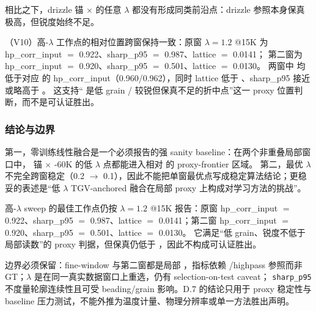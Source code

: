 相比之下，drizzle 锚 \(\times\)  的任意 \(\lambda\) 都没有形成同类前沿点：drizzle 参照本身保真极高，但锐度始终不足。

（V10）高-\(\lambda\) 工作点的相对位置跨窗保持一致：原窗 \(\lambda = 1.2\) @15K 为 hp\_corr\_input \(=\) 0.922、sharp\_p95 \(=\) 0.987、lattice \(=\) 0.0141；
第二窗为 hp\_corr\_input \(=\) 0.920、sharp\_p95 \(=\) 0.501、lattice \(=\) 0.0130。
两窗中  均低于对应  的 hp\_corr\_input（0.960/0.962），同时 lattice 低于 、sharp\_p95 接近或略高于 。
这支持“ 是低 grain / 较锐但保真不足的折中点”这一 proxy 位置判断，而不是可认证胜出。

\subsubsection{结论与边界}

第一，零训练线性融合是一个必须报告的强 sanity baseline：在两个非重叠局部窗口中， 锚 \(\times\) -60K 的低 \(\lambda\) 点都能进入相对  的 proxy-frontier 区域。
第二，最优 \(\lambda\) 不完全跨窗稳定（0.2 \(\rightarrow\) 0.1），因此不能把单窗最优点写成稳定算法结论；更稳妥的表述是“低 \(\lambda\) TGV-anchored 融合在局部 proxy 上构成对学习方法的挑战”。

 高-\(\lambda\) sweep 的最佳工作点仍按 \(\lambda = 1.2\) @15K 报告：原窗 hp\_corr\_input \(=\) 0.922、sharp\_p95 \(=\) 0.987、lattice \(=\) 0.0141；第二窗 hp\_corr\_input \(=\) 0.920、sharp\_p95 \(=\) 0.501、lattice \(=\) 0.0130。
它满足“低 grain、锐度不低于  局部读数”的 proxy 判据，但保真仍低于 ，因此不构成可认证胜出。

边界必须保留：fine-window 与第二窗都是局部 ，指标依赖 /highpass 参照而非 GT；\(\lambda\) 是在同一真实数据窗口上重选，仍有 selection-on-test caveat；
\texttt{sharp\_p95} 不度量轮廓连续性且可受 beading/grain 影响。D.7 的结论只用于 proxy 稳定性与 baseline 压力测试，不能外推为温度计量、物理分辨率或单一方法胜出声明。
